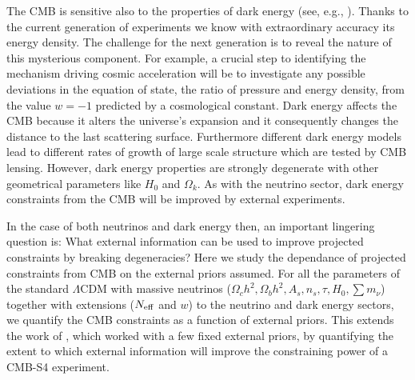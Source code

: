 \documentclass[aps,prd,reprint,superscriptaddress]{revtex4-1}
\begin{document}
The CMB is sensitive also to the properties of dark energy (see, e.g., \cite{2010MNRAS.405.2639J}). Thanks to the current generation of experiments we know with extraordinary accuracy its energy density. The challenge for the next generation is to reveal the nature of this mysterious component. For example, a crucial step to identifying the mechanism driving cosmic acceleration will be to investigate any possible deviations in the equation of state, the ratio of pressure and energy density, from the value $w=-1$ predicted by a cosmological constant. 
Dark energy affects the CMB because it alters the universe's expansion and it consequently changes the distance to the last scattering surface. Furthermore different dark energy models lead to different rates of growth of large scale structure which are tested by CMB lensing. 
However, dark energy properties are strongly degenerate with other geometrical parameters like $H_{0}$ and $\Omega_{k}$. As with the neutrino sector, dark energy constraints from the CMB 
will be improved by external experiments.

In the case of both neutrinos and dark energy then, an important lingering question is: What external information can be used to improve projected constraints by breaking degeneracies?
Here we study the dependance of projected constraints from CMB on the external priors assumed.  For all the parameters of the standard $\Lambda$CDM with massive neutrinos ($\Omega_ch^2, \Omega_bh^2, A_s, n_s, \tau, H_0, \sum m_\nu$) together with extensions ($N_{\rm eff}$ and $w$) to the neutrino and dark energy sectors, we quantify the CMB constraints as a function of external priors. This extends the work of \citet{wu:2014}, which worked with a few fixed external priors, by quantifying the extent to which external information will improve the constraining power of a CMB-S4 experiment. 
\end{document}

